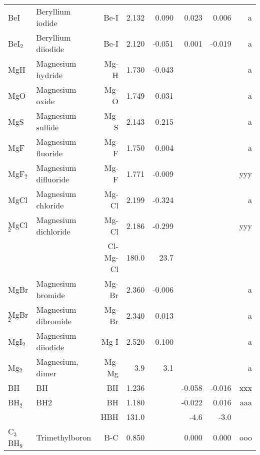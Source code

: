 \begin{table}
\begin{center}
\begin{tabular}{llrrrrrr}
 BeI         & Beryllium iodide                   &Be-I          &     2.132   &     0.090 &     0.023 &     0.006 &     a \\
 BeI$_2$        & Beryllium diiodide                 &Be-I          &     2.120   &    -0.051 &     0.001 &    -0.019 &     a \\
 MgH         & Magnesium hydride                  &Mg-H          &     1.730   &    -0.043 &  &  &     a \\
 MgO         & Magnesium oxide                    &Mg-O          &     1.749   &     0.031 &  &  &     a \\
 MgS         & Magnesium sulfide                  &Mg-S          &     2.143   &     0.215 &  &  &     a \\
 MgF         & Magnesium fluoride                 &Mg-F          &     1.750   &     0.004 &  &  &     a \\
 MgF$_2$        & Magnesium difluoride               &Mg-F          &     1.771   &    -0.009 &  &  &   yyy \\
 MgCl        & Magnesium chloride                 &Mg-Cl         &     2.199   &    -0.324 &  &  &     a \\
 MgCl$_2$       & Magnesium dichloride               &Mg-Cl         &     2.186   &    -0.299 &  &  &   yyy \\
             &                                    &Cl-Mg-Cl    &     180.0   &      23.7 &  &    &       \\
 MgBr        & Magnesium bromide                  &Mg-Br         &     2.360   &    -0.006 &  &  &     a \\
 MgBr$_2$       & Magnesium dibromide                &Mg-Br         &     2.340   &     0.013 &  &  &     a \\
 MgI$_2$        & Magnesium diiodide                 &Mg-I          &     2.520   &    -0.100 &  &  &     a \\
 Mg$_2$         & Magnesium, dimer                   &Mg-Mg       &       3.9   &       3.1 &  &    &     a \\
 BH          & BH                                 &BH            &     1.236   &  &    -0.058 &    -0.016 &   xxx \\
 BH$_2$         & BH2                                &BH            &     1.180   &  &    -0.022 &     0.016 &   aaa \\
             &                                    &HBH         &     131.0   &  &      -4.6 &      -3.0   &       \\
 C$_3$BH$_9$       & Trimethylboron                     &B-C           &     0.850   &  &     0.000 &     0.000 &   ooo \\
\hline
\end{tabular}
\end{center}
\end{table}
\clearpage

